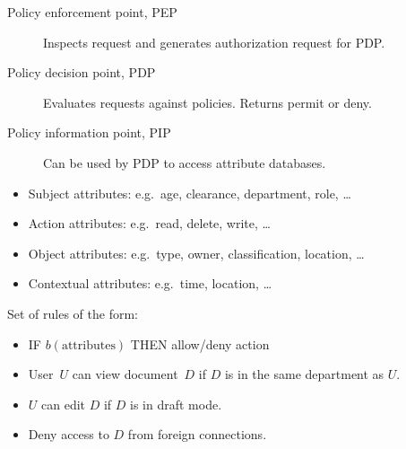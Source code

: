 \begin{frame}
  \begin{definition}[Architecture]
    \begin{description}
      \item[Policy enforcement point, PEP] Inspects request and generates 
        authorization request for PDP.

      \item[Policy decision point, PDP] Evaluates requests against policies.
        Returns permit or deny.

      \item[Policy information point, PIP] Can be used by PDP to access 
        attribute databases.
    \end{description}
  \end{definition}
\end{frame}

\begin{frame}
  \begin{example}[Attributes]
    \begin{itemize}
      \item Subject attributes: e.g.\ age, clearance, department, role, \dots
      \item Action attributes: e.g.\ read, delete, write, \dots
      \item Object attributes: e.g.\ type, owner, classification, location, 
        \dots
      \item Contextual attributes: e.g.\ time, location, \dots
    \end{itemize}
  \end{example}
\end{frame}

\begin{frame}
  \begin{definition}
    Set of rules of the form:
    \begin{itemize}
      \item IF \(b(\text{attributes})\) THEN allow/deny action
    \end{itemize}
  \end{definition}
\end{frame}

\begin{frame}
  \begin{example}
    \begin{itemize}
      \item User~\(U\) can view document~\(D\) if \(D\) is in the same 
        department as \(U\).
      \item \(U\) can edit \(D\) if \(D\) is in draft mode.
      \item Deny access to \(D\) from foreign connections.
    \end{itemize}
  \end{example}
\end{frame}

